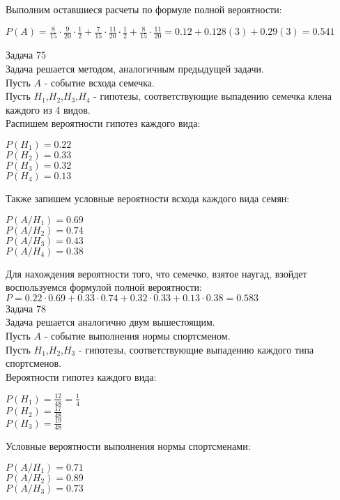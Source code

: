 Выполним оставшиеся расчеты по формуле полной вероятности:\\
\begin{center}
$P(A)=\frac{8}{15}\cdot \frac{9}{20}\cdot \frac{1}{2} + \frac{7}{15}\cdot \frac{11}{20}\cdot \frac{1}{2} + \frac{8}{15}\cdot \frac{11}{20}=0.12 + 0.128(3) + 0.29(3)= 0.541 $\\
\end{center}
Задача 75\\
Задача решается методом, аналогичным предыдущей задачи.\\
Пусть $A$ - событие всхода семечка.\\
Пусть $H_1$,$H_2$,$H_3$,$H_4$ - гипотезы, соответствующие выпадению семечка клена каждого из 4 видов.\\
Распишем вероятности  гипотез каждого вида:\\

\begin{center}
$P(H_1)=0.22$ \\
$P(H_2)=0.33$ \\
$P(H_3)=0.32$ \\
$P(H_4)=0.13$ \\
\end{center}
Также запишем условные вероятности всхода каждого вида семян:\\
\begin{center}
$P(A/H_1)=0.69$\\
$P(A/H_2)=0.74$\\
$P(A/H_3)=0.43$\\
$P(A/H_4)=0.38$\\
\end{center}
Для нахождения вероятности того, что семечко, взятое наугад, взойдет воспользуемся формулой полной вероятности:\\
$P=0.22\cdot 0.69 + 0.33\cdot 0.74 + 0.32 \cdot 0.33 + 0.13\cdot 0.38=0.583$\\

Задача 78\\
Задача решается аналогично двум вышестоящим.\\
Пусть $A$ - событие выполнения нормы спортсменом.\\
Пусть $H_1$,$H_2$,$H_3$ - гипотезы, соответствующие выпадению каждого типа спортсменов.\\
Вероятности гипотез каждого вида:\\
\begin{center}
$P(H_1)=\frac{12}{48}=\frac{1}{4}$ \\
$P(H_2)=\frac{17}{48}$ \\
$P(H_3)=\frac{19}{48}$ \\
\end{center}
Условные вероятности выполнения нормы спортсменами:\\
\begin{center}
$P(A/H_1)=0.71$\\
$P(A/H_2)=0.89$\\
$P(A/H_3)=0.73$\\
\end{center}

